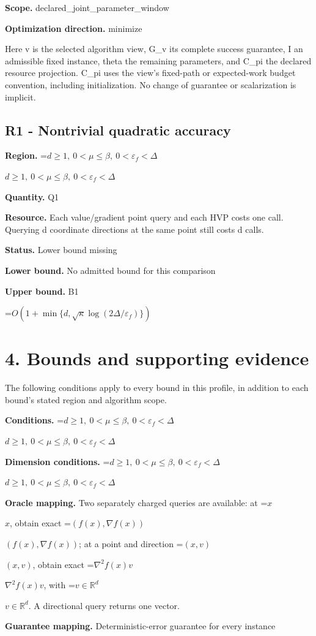 \documentclass[10pt,a4paper]{article}
\newcommand{\AtlasMath}[1]{\par\begingroup\centering\setbox0=\hbox{$\displaystyle #1$}\ifdim\wd0>1.4\linewidth\typeout{ATLAS WIDE FORMULA: \the\wd0}\fi\ifdim\wd0>\linewidth\resizebox{\linewidth}{!}{\box0}\else\box0\fi\par\endgroup}
\newcommand{\AtlasInlineMath}[1]{\begingroup\setbox0=\hbox{$#1$}\ifdim\wd0>.4\linewidth\endgroup\AtlasMath{#1}\else\endgroup$#1$\fi}
\begin{document}
\textbf{Scope.} declared\_joint\_parameter\_window

\textbf{Optimization direction.} minimize

Here v is the selected algorithm view, G\_v its complete success guarantee, I an admissible fixed instance, theta the remaining parameters, and C\_pi the declared resource projection. C\_pi uses the view's fixed-path or expected-work budget convention, including initialization. No change of guarantee or scalarization is implicit.

\subsection{R1 - Nontrivial quadratic accuracy}
\textbf{Region.} \AtlasInlineMath{d\ge1,\ 0<\mu\le\beta,\ 0<\varepsilon_f<\Delta}

\textbf{Quantity.} Q1

\textbf{Resource.} Each value/gradient point query and each HVP costs one call. Querying d coordinate directions at the same point still costs d calls.

\textbf{Status.} Lower bound missing

\textbf{Lower bound.} No admitted bound for this comparison

\textbf{Upper bound.} B1

\AtlasMath{O(1+\min\{d,\sqrt\kappa\log(2\Delta/\varepsilon_f)\})}
\section{4. Bounds and supporting evidence}
The following conditions apply to every bound in this profile, in addition to each bound's stated region and algorithm scope.

\textbf{Conditions.} \AtlasInlineMath{d\ge1,\ 0<\mu\le\beta,\ 0<\varepsilon_f<\Delta}

\textbf{Dimension conditions.} \AtlasInlineMath{d\ge1,\ 0<\mu\le\beta,\ 0<\varepsilon_f<\Delta}

\textbf{Oracle mapping.} Two separately charged queries are available: at \AtlasInlineMath{x}, obtain exact \AtlasInlineMath{(f(x),\nabla f(x))}; at a point and direction \AtlasInlineMath{(x,v)}, obtain exact \AtlasInlineMath{\nabla^2f(x)v}, with \AtlasInlineMath{v\in\mathbb{R}^d}. A directional query returns one vector.

\textbf{Guarantee mapping.} Deterministic-error guarantee for every instance
\end{document}
